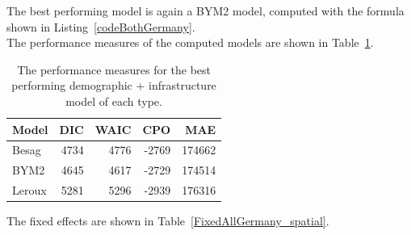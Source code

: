 The best performing model is again a BYM2 model, computed with the formula shown in Listing~\ref{codeBothGermany}. \\
The performance measures of the computed models are shown in Table~\ref{allGermany}.
\begin{table}[H] 
\caption{The performance measures for the best performing demographic + infrastructure model of each type. \label{allGermany}}
\begin{tabular}{l r r r r}
\toprule
\textbf{Model}	& \textbf{DIC}	& \textbf{WAIC} & \textbf{CPO} & \textbf{MAE}\\
\midrule
Besag&  4734 & 4776 & -2769 & 174662\\
BYM2 & 4645 & 4617 & -2729 & 174514\\
Leroux & 5281 & 5296 & -2939 & 176316 \\
\bottomrule
\end{tabular}
\end{table}
The fixed effects are shown in Table~\ref{FixedAllGermany_spatial}.

